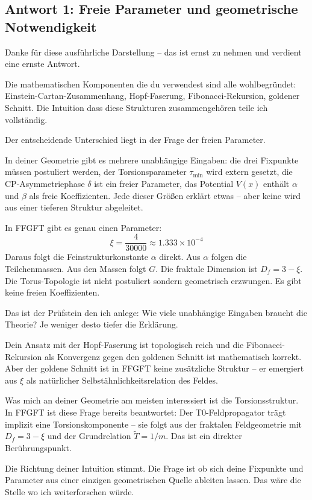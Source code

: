 \documentclass[12pt, a4paper]{article}
\newcommand{\xipar}{\xi}
\newcommand{\Tfield}{\tilde{T}}
\newcommand{\Dfrak}{D_f}
\begin{document}
\subsection{Antwort 1: Freie Parameter und geometrische Notwendigkeit}

\begin{response}
Danke für diese ausführliche Darstellung -- das ist ernst zu nehmen und verdient eine ernste Antwort.

Die mathematischen Komponenten die du verwendest sind alle wohlbegründet: Einstein-Cartan-Zusammenhang, Hopf-Faserung, Fibonacci-Rekursion, goldener Schnitt. Die Intuition dass diese Strukturen zusammengehören teile ich vollständig.

Der entscheidende Unterschied liegt in der Frage der freien Parameter.

In deiner Geometrie gibt es mehrere unabhängige Eingaben: die drei Fixpunkte müssen postuliert werden, der Torsionsparameter $\tau_{\min}$ wird extern gesetzt, die CP-Asymmetriephase $\delta$ ist ein freier Parameter, das Potential $V(x)$ enthält $\alpha$ und $\beta$ als freie Koeffizienten. Jede dieser Größen erklärt etwas -- aber keine wird aus einer tieferen Struktur abgeleitet.

In FFGFT gibt es genau einen Parameter:
\begin{equation}
  \xipar = \frac{4}{30000} \approx 1.333 \times 10^{-4}
\end{equation}
Daraus folgt die Feinstrukturkonstante $\alpha$ direkt. Aus $\alpha$ folgen die Teilchenmassen. Aus den Massen folgt $G$. Die fraktale Dimension ist $\Dfrak = 3 - \xipar$. Die Torus-Topologie ist nicht postuliert sondern geometrisch erzwungen. Es gibt keine freien Koeffizienten.

\medskip
Das ist der Prüfstein den ich anlege: Wie viele unabhängige Eingaben braucht die Theorie? Je weniger desto tiefer die Erklärung.

\medskip
Dein Ansatz mit der Hopf-Faserung ist topologisch reich und die Fibonacci-Rekursion als Konvergenz gegen den goldenen Schnitt ist mathematisch korrekt. Aber der goldene Schnitt ist in FFGFT keine zusätzliche Struktur -- er emergiert aus $\xipar$ als natürlicher Selbstähnlichkeitsrelation des Feldes.

\medskip
Was mich an deiner Geometrie am meisten interessiert ist die Torsionsstruktur. In FFGFT ist diese Frage bereits beantwortet: Der T0-Feldpropagator trägt implizit eine Torsionskomponente -- sie folgt aus der fraktalen Feldgeometrie mit $\Dfrak = 3 - \xipar$ und der Grundrelation $\Tfield = 1/m$. Das ist ein direkter Berührungspunkt.

\medskip
Die Richtung deiner Intuition stimmt. Die Frage ist ob sich deine Fixpunkte und Parameter aus einer einzigen geometrischen Quelle ableiten lassen. Das wäre die Stelle wo ich weiterforschen würde.
\end{response}
\end{document}
